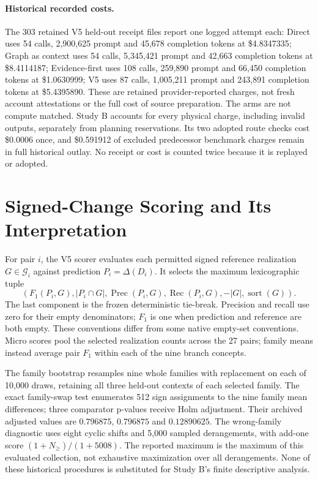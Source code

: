 \paragraph{Historical recorded costs.}
The 303 retained V5 held-out receipt files report one logged attempt each:
Direct uses 54 calls, 2,900,625 prompt and 45,678 completion tokens at
\$4.8347335; Graph as context uses 54 calls, 5,345,421 prompt and 42,663
completion tokens at \$8.4114187; Evidence-first uses 108 calls, 259,890
prompt and 66,450 completion tokens at \$1.0630999; V5 uses 87 calls,
1,005,211 prompt and 243,891 completion tokens at \$5.4395890. These are
retained provider-reported charges, not fresh account attestations or the
full cost of source preparation. The arms are not compute matched.
Study B accounts for every physical charge, including invalid outputs,
separately from planning reservations. Its two adopted route checks cost
\$0.0006 once, and \$0.591912 of excluded predecessor benchmark charges
remain in full historical outlay. No receipt or cost is counted twice
because it is replayed or adopted.

\section{Signed-Change Scoring and Its Interpretation}
\label{app:paired-metrics}

For pair $i$, the V5 scorer evaluates each permitted signed reference
realization $G\in\mathcal G_i$ against prediction $P_i=\Delta(D_i)$. It
selects the maximum lexicographic tuple
\[
\left(F_1(P_i,G), |P_i\cap G|, \operatorname{Prec}(P_i,G),
\operatorname{Rec}(P_i,G), -|G|, \operatorname{sort}(G)\right).
\]
The last component is the frozen deterministic tie-break. Precision and
recall use zero for their empty denominators; $F_1$ is one when prediction
and reference are both empty. These conventions differ from some native
empty-set conventions. Micro scores pool the selected realization counts
across the 27 pairs; family means instead average pair $F_1$ within each
of the nine branch concepts.

The family bootstrap resamples nine whole families with replacement on
each of 10,000 draws, retaining all three held-out contexts of each selected
family. The exact family-swap test enumerates 512 sign assignments to the
nine family mean differences; three comparator p-values receive Holm
adjustment. Their archived adjusted values are $0.796875$, $0.796875$ and
$0.12890625$. The wrong-family diagnostic uses eight cyclic shifts and
5,000 sampled derangements, with add-one score $(1+N_{\ge})/(1+5008)$.
The reported maximum is the maximum of this evaluated collection, not
exhaustive maximization over all derangements. None of these historical
procedures is substituted for Study B's finite descriptive analysis.


